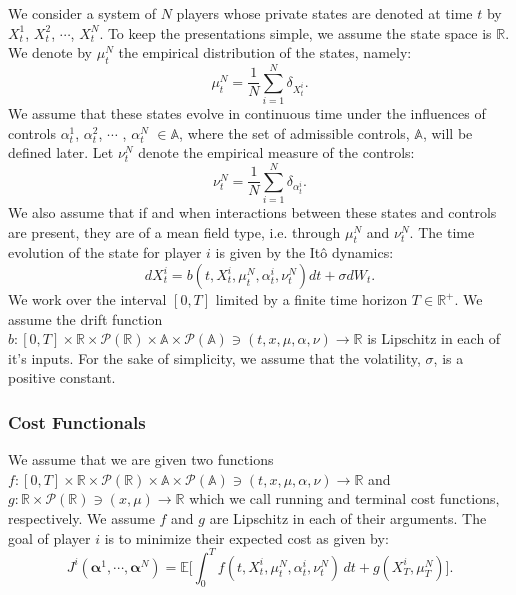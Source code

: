 \documentclass[11pt]{article}
\def\balpha{\boldsymbol{\alpha}}
\newcommand\cP{\mathcal P}
\newcommand\EE{\mathbb E}
\begin{document}
We consider a system of $N$ players whose private states are denoted at time $t$ by $X^1_t$, $X^2_t$, $\cdots$, $X^N_t$. To keep the presentations simple, we assume the state space is $\mathbb{R}$. We denote by $\mu^N_t$ the empirical distribution of the states, namely:
\begin{equation*}
\mu^N_t=\frac1N\sum_{i=1}^N\delta_{X^i_t}.
\end{equation*}
We assume that these states evolve in continuous time under the influences of controls  $\alpha^1_t$, $\alpha^2_t$, $\cdots$ , $\alpha^N_t$ $\in \mathbb{A}$, where the set of admissible controls, $\mathbb{A}$, will be defined later. Let $\nu^N_{t}$ denote the empirical measure of the controls:
\begin{equation*}
\nu^N_t=\frac1N\sum_{i=1}^N\delta_{\alpha^i_t}.
\end{equation*}
We also assume that if and when interactions between these states and controls are present, they are of a mean field type, i.e. through $\mu^N_t$ and $\nu^N_t$. The time evolution of the state for player $i$ is given by the It\^{o} dynamics:
\begin{equation*}
    dX^i_t=b(t,X^i_t,\mu^N_t,\alpha^i_t,\nu^N_t)dt+\sigma dW_t.
\end{equation*}
We work over the interval $[0,T]$ limited by a finite time horizon $T \in \mathbb{R}^+$. We assume the drift function $b:[0,T] \times \mathbb{R} \times \cP(\mathbb{R}) \times \mathbb{A} \times \cP(\mathbb{A}) \ni (t,x,\mu,\alpha,\nu)  \rightarrow \mathbb{R}$ is Lipschitz in each of it's inputs. For the sake of simplicity, we assume that the volatility, $\sigma$, is a positive constant.

\subsubsection*{\textbf{Cost Functionals}}
We assume that we are given two functions $f:[0,T] \times \mathbb{R} \times \cP(\mathbb{R}) \times \mathbb{A} \times \cP(\mathbb{A}) \ni (t,x,\mu,\alpha, \nu) \rightarrow \mathbb{R}$ and $g:\mathbb{R}\times \cP(\mathbb{R}) \ni (x,\mu) \rightarrow \mathbb{R}$ which we call running and terminal cost functions, respectively. We assume $f$ and $g$ are Lipschitz in each of their arguments. The goal of player $i$ is to minimize their expected cost as given by:
\begin{equation*}
J^i(\balpha^1,\cdots,\balpha^N)=\EE\bigg[\int_0^Tf(t,X^i_t,\mu^N_{t},\alpha^i_t,\nu^N_{t})\,dt +g(X^i_T,\mu^{N}_{T})\bigg].
\end{equation*}
\end{document}
